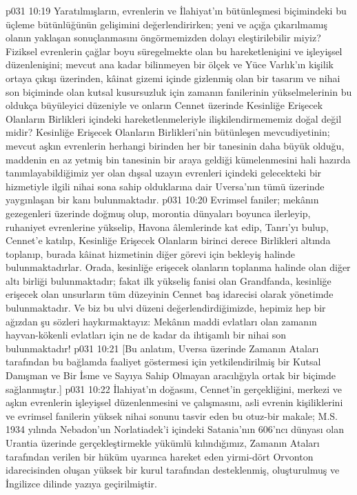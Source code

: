\vs p031 10:19 Yaratılmışların, evrenlerin ve İlahiyat’ın bütünleşmesi biçimindeki bu üçleme bütünlüğünün gelişimini değerlendirirken; yeni ve açığa çıkarılmamış olanın yaklaşan sonuçlanmasını öngörmemizden dolayı eleştirilebilir miyiz? Fiziksel evrenlerin çağlar boyu süregelmekte olan bu hareketlenişini ve işleyişsel düzenlenişini; mevcut ana kadar bilinmeyen bir ölçek ve Yüce Varlık’ın kişilik ortaya çıkışı üzerinden, kâinat gizemi içinde gizlenmiş olan bir tasarım ve nihai son biçiminde olan kutsal kusursuzluk için zamanın fanilerinin yükselmelerinin bu oldukça büyüleyici düzeniyle ve onların Cennet üzerinde Kesinliğe Erişecek Olanların Birlikleri içindeki hareketlenmeleriyle ilişkilendirmememiz doğal değil midir? Kesinliğe Erişecek Olanların Birlikleri’nin bütünleşen mevcudiyetinin; mevcut aşkın evrenlerin herhangi birinden her bir tanesinin daha büyük olduğu, maddenin en az yetmiş bin tanesinin bir araya geldiği kümelenmesini hali hazırda tanımlayabildiğimiz yer olan dışsal uzayın evrenleri içindeki gelecekteki bir hizmetiyle ilgili nihai sona sahip olduklarına dair Uversa’nın tümü üzerinde yaygınlaşan bir kanı bulunmaktadır.
\vs p031 10:20 Evrimsel faniler; mekânın gezegenleri üzerinde doğmuş olup, morontia dünyaları boyunca ilerleyip, ruhaniyet evrenlerine yükselip, Havona âlemlerinde kat edip, Tanrı’yı bulup, Cennet’e katılıp, Kesinliğe Erişecek Olanların birinci derece Birlikleri altında toplanıp, burada kâinat hizmetinin diğer görevi için bekleyiş halinde bulunmaktadırlar. Orada, kesinliğe erişecek olanların toplanma halinde olan diğer altı birliği bulunmaktadır; fakat ilk yükseliş fanisi olan Grandfanda, kesinliğe erişecek olan unsurların tüm düzeyinin Cennet baş idarecisi olarak yönetimde bulunmaktadır. Ve biz bu ulvi düzeni değerlendirdiğimizde, hepimiz hep bir ağızdan şu sözleri haykırmaktayız: Mekânın maddi evlatları olan zamanın hayvan\hyp{}kökenli evlatları için ne de kadar da ihtişamlı bir nihai son bulunmaktadır!
\vs p031 10:21 [Bu anlatım, Uversa üzerinde Zamanın Ataları tarafından bu bağlamda faaliyet göstermesi için yetkilendirilmiş bir Kutsal Danışman ve Bir İsme ve Sayıya Sahip Olmayan aracılığıyla ortak bir biçimde sağlanmıştır.]
\separatorline
\vs p031 10:22 İlahiyat’ın doğasını, Cennet’in gerçekliğini, merkezi ve aşkın evrenlerin işleyişsel düzenlenmesini ve çalışmasını, asli evrenin kişiliklerini ve evrimsel fanilerin yüksek nihai sonunu tasvir eden bu otuz\hyp{}bir makale; M.S. 1934 yılında Nebadon’un Norlatiadek’i içindeki Satania’nın 606’ncı dünyası olan Urantia üzerinde gerçekleştirmekle yükümlü kılındığımız, Zamanın Ataları tarafından verilen bir hüküm uyarınca hareket eden yirmi\hyp{}dört Orvonton idarecisinden oluşan yüksek bir kurul tarafından desteklenmiş, oluşturulmuş ve İngilizce dilinde yazıya geçirilmiştir.
